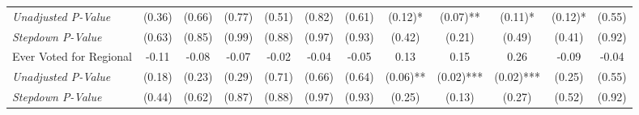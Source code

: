 \begin{tabular}{l c c c c c c c c c c c}
\quad \textit{Unadjusted P-Value} & (0.36) & (0.66) & (0.77) & (0.51) & (0.82) & (0.61) & (0.12)* & (0.07)** & (0.11)* & (0.12)* & (0.55) \\
\quad \textit{Stepdown P-Value} & (0.63) & (0.85) & (0.99) & (0.88) & (0.97) & (0.93) & (0.42) & (0.21) & (0.49) & (0.41) & (0.92) \\
Ever Voted for Regional & -0.11 & -0.08 & -0.07 & -0.02 & -0.04 & -0.05 & 0.13 & 0.15 & 0.26 & -0.09 & -0.04 \\
\quad \textit{Unadjusted P-Value} & (0.18) & (0.23) & (0.29) & (0.71) & (0.66) & (0.64) & (0.06)** & (0.02)*** & (0.02)*** & (0.25) & (0.55) \\
\quad \textit{Stepdown P-Value} & (0.44) & (0.62) & (0.87) & (0.88) & (0.97) & (0.93) & (0.25) & (0.13) & (0.27) & (0.52) & (0.92) \\
\bottomrule
\end{tabular}
